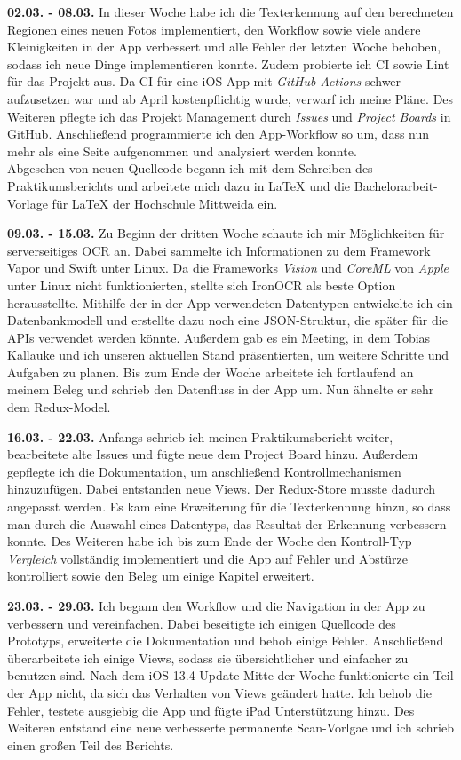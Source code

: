 \documentclass[notables, nomenclature, oneside, 150]{HSMW-Thesis}
\begin{document}
	\textbf{02.03. - 08.03.} 
	In dieser Woche habe ich die Texterkennung auf den berechneten Regionen eines neuen Fotos implementiert, den Workflow sowie viele andere Kleinigkeiten in der App verbessert und alle Fehler der letzten Woche behoben, sodass ich neue Dinge implementieren konnte. Zudem probierte ich CI sowie Lint für das Projekt aus. Da CI für eine iOS-App mit \textit{GitHub Actions} schwer aufzusetzen war und ab April kostenpflichtig wurde, verwarf ich meine Pläne. Des Weiteren pflegte ich das Projekt Management durch \textit{Issues} und \textit{Project Boards} in GitHub. Anschließend programmierte ich den App-Workflow so um, dass nun mehr als eine Seite aufgenommen und analysiert werden konnte. \\ 			
	Abgesehen von neuen Quellcode begann ich mit dem Schreiben des Praktikumsberichts und arbeitete mich dazu in \LaTeX \xspace und die Bachelorarbeit-Vorlage für \LaTeX \xspace der Hochschule Mittweida ein.
	
	\textbf{09.03. - 15.03.} 
	Zu Beginn der dritten Woche schaute ich mir Möglichkeiten für serverseitiges OCR an. Dabei sammelte ich Informationen zu dem Framework Vapor und Swift unter Linux. Da die Frameworks \textit{Vision} und \textit{CoreML} von \textit{Apple} unter Linux nicht funktionierten, stellte sich IronOCR als beste Option herausstellte. Mithilfe der in der App verwendeten Datentypen entwickelte ich ein Datenbankmodell und erstellte dazu noch eine JSON-Struktur, die später für die APIs verwendet werden könnte. Außerdem gab es ein Meeting, in dem Tobias Kallauke und ich unseren aktuellen Stand präsentierten, um weitere Schritte und Aufgaben zu planen. Bis zum Ende der Woche arbeitete ich fortlaufend an meinem Beleg und schrieb den Datenfluss in der App um. Nun ähnelte er sehr dem Redux-Model.
	
	\textbf{16.03. - 22.03.} 
	Anfangs schrieb ich meinen Praktikumsbericht weiter, bearbeitete alte Issues und fügte neue dem Project Board hinzu. Außerdem gepflegte ich die Dokumentation, um anschließend Kontrollmechanismen hinzuzufügen. Dabei entstanden neue Views. Der Redux-Store musste dadurch angepasst werden. Es kam eine Erweiterung für die Texterkennung hinzu, so dass man durch die Auswahl eines Datentyps, das Resultat der Erkennung verbessern konnte. Des Weiteren habe ich bis zum Ende der Woche den Kontroll-Typ \textit{Vergleich} vollständig implementiert und die App auf Fehler und Abstürze kontrolliert sowie den Beleg um einige Kapitel erweitert.
	
	\textbf{23.03. - 29.03.} 
	Ich begann den Workflow und die Navigation in der App zu verbessern und vereinfachen. Dabei beseitigte ich einigen Quellcode des Prototyps, erweiterte die Dokumentation und behob einige Fehler. Anschließend überarbeitete ich einige Views, sodass sie übersichtlicher und einfacher zu benutzen sind. Nach dem iOS 13.4 Update Mitte der Woche funktionierte ein Teil der App nicht, da sich das Verhalten von Views geändert hatte. Ich behob die Fehler, testete ausgiebig die App und fügte iPad Unterstützung hinzu. Des Weiteren entstand eine neue verbesserte permanente Scan-Vorlgae und ich schrieb einen großen Teil des Berichts.
	
\end{document}
